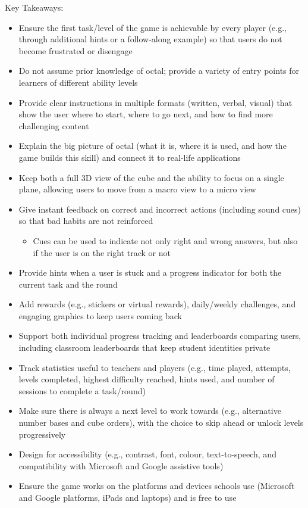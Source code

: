 \documentclass{article}
\begin{document}
Key Takeaways:

\begin{itemize}
  \item Ensure the first task/level of the game is achievable by every player (e.g., through additional hints or a follow-along example) so that users do not become frustrated or disengage
  \item Do not assume prior knowledge of octal; provide a variety of entry points for learners of different ability levels
  \item Provide clear instructions in multiple formats (written, verbal, visual) that show the user where to start, where to go next, and how to find more challenging content
  \item Explain the big picture of octal (what it is, where it is used, and how the game builds this skill) and connect it to real-life applications
  \item Keep both a full 3D view of the cube and the ability to focus on a single plane, allowing users to move from a macro view to a micro view
  \item Give instant feedback on correct and incorrect actions (including sound cues) so that bad habits are not reinforced
  \begin{itemize}
    \item Cues can be used to indicate not only right and wrong answers, but also if the user is on the right track or not
  \end{itemize}
  \item Provide hints when a user is stuck and a progress indicator for both the current task and the round
  \item Add rewards (e.g., stickers or virtual rewards), daily/weekly challenges, and engaging graphics to keep users coming back
  \item Support both individual progress tracking and leaderboards comparing users, including classroom leaderboards that keep student identities private
  \item Track statistics useful to teachers and players (e.g., time played, attempts, levels completed, highest difficulty reached, hints used, and number of sessions to complete a task/round)
  \item Make sure there is always a next level to work towards (e.g., alternative number bases and cube orders), with the choice to skip ahead or unlock levels progressively
  \item Design for accessibility (e.g., contrast, font, colour, text-to-speech, and compatibility with Microsoft and Google assistive tools)
  \item Ensure the game works on the platforms and devices schools use (Microsoft and Google platforms, iPads and laptops) and is free to use
\end{itemize}
\end{document}
